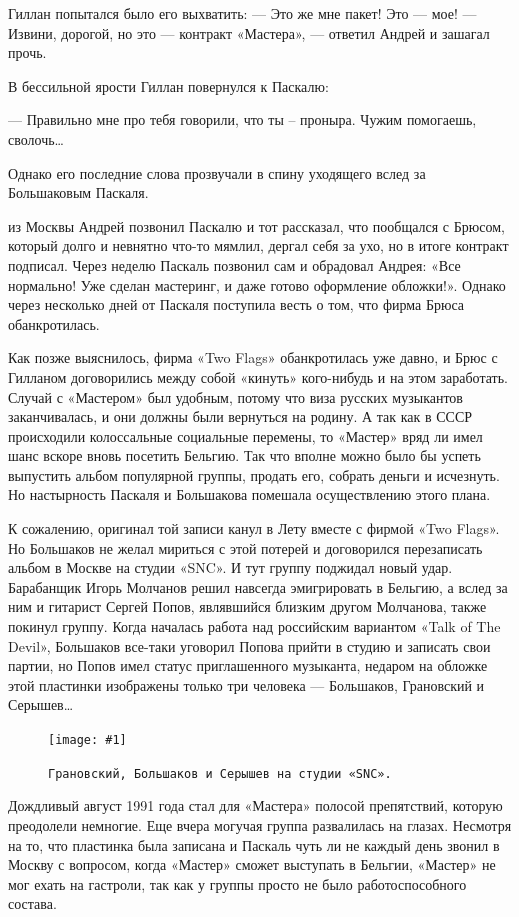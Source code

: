\documentclass[16pt,a5paper]{book}
\newcommand{\myincludegraphics}[1]{\texttt{[image: \#1]}}
\begin{document}
Гиллан попытался было его выхватить:
— Это же мне пакет! Это — мое!
— Извини, дорогой, но это — контракт «Мастера», — ответил Андрей и зашагал прочь.

В бессильной ярости Гиллан повернулся к Паскалю:

— Правильно мне про тебя говорили, что ты – проныра. Чужим помогаешь, сволочь\ldots

Однако его последние слова прозвучали в спину уходящего вслед за Большаковым Паскаля.

 из Москвы Андрей позвонил Паскалю и тот рассказал, что пообщался с Брюсом, который долго и невнятно что-то
мямлил, дергал себя за ухо, но в итоге контракт подписал. Через неделю Паскаль позвонил сам и обрадовал Андрея: «Все
нормально! Уже сделан мастеринг, и даже готово оформление обложки!». Однако через несколько дней от Паскаля поступила
весть о том, что фирма Брюса обанкротилась.

Как позже выяснилось, фирма «Two Flags» обанкротилась уже давно, и Брюс с Гилланом договорились между собой «кинуть»
кого-нибудь и на этом заработать. Случай с «Мастером» был удобным, потому что виза русских музыкантов заканчивалась, и
они должны были вернуться на родину. А так как в СССР происходили колоссальные социальные перемены, то «Мастер» вряд ли
имел шанс вскоре вновь посетить Бельгию. Так что вполне можно было бы успеть выпустить альбом популярной группы, продать
его, собрать деньги и исчезнуть. Но настырность Паскаля и Большакова помешала осуществлению этого плана.

К сожалению, оригинал той записи канул в Лету вместе с фирмой «Two Flags». Но Большаков не желал мириться с этой потерей
и договорился перезаписать альбом в Москве на студии «SNC». И тут группу поджидал новый удар. Барабанщик Игорь Молчанов
решил навсегда эмигрировать в Бельгию, а вслед за ним и гитарист Сергей Попов, являвшийся близким другом Молчанова,
также покинул группу. Когда началась работа над российским вариантом «Talk of The Devil», Большаков все-таки уговорил
Попова прийти в студию и записать свои партии, но Попов имел статус приглашенного музыканта, недаром на обложке этой
пластинки изображены только три человека — Большаков, Грановский и Серышев\ldots

\begin{figure}[h]
    \centering
    \myincludegraphics{Image27}
    \caption{\texttt{Грановский, Большаков и Серышев на студии «SNC».}}
\end{figure}

Дождливый август 1991 года стал для «Мастера» полосой препятствий, которую преодолели немногие. Еще вчера могучая группа
развалилась на глазах. Несмотря на то, что пластинка была записана и Паскаль чуть ли не каждый день звонил в Москву с
вопросом, когда «Мастер» сможет выступать в Бельгии, «Мастер» не мог ехать на гастроли, так как у группы просто не было
работоспособного состава.
\end{document}
